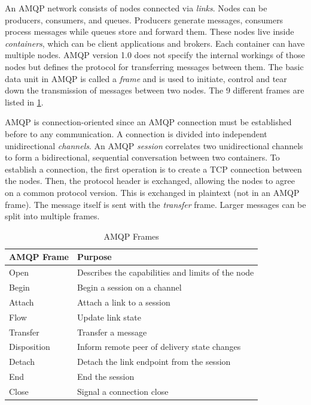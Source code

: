An AMQP network consists of nodes connected via \textit{links}. Nodes can be
producers, consumers, and queues. Producers generate messages, consumers process
messages while queues store and forward them. These nodes live inside
\textit{containers}, which can be client applications and brokers. Each
container can have multiple nodes. AMQP version 1.0 does not specify the
internal workings of those nodes but defines the protocol for transferring
messages between them. The basic data unit in AMQP is called a \textit{frame}
and is used to initiate, control and tear down the transmission of messages
between two nodes. The 9 different frames are listed in
\cref{table-amqp-frames}.

AMQP is connection-oriented since an AMQP connection must be established before
to any communication. A connection is divided into independent unidirectional
\textit{channels}. An AMQP \textit{session} correlates two unidirectional
channels to form a bidirectional, sequential conversation between two
containers. To establish a connection, the first operation is to create a TCP
connection between the nodes. Then, the protocol header is exchanged, allowing
the nodes to agree on a common protocol version. This is exchanged in plaintext
(not in an AMQP frame). The message itself is sent with the \textit{transfer}
frame. Larger messages can be split into multiple frames.


\begin{table}[h]
\begin{tabularx}{\textwidth}{| X | X |}
\hline
  \textbf{AMQP Frame} & \textbf{Purpose} \\ \hline
  Open & Describes the capabilities and limits of the node \\ \hline
  Begin & Begin a session on a channel \\ \hline
  Attach & Attach a link to a session \\ \hline
  Flow & Update link state \\ \hline
  Transfer & Transfer a message \\ \hline
  Disposition & Inform remote peer of delivery state changes \\ \hline
  Detach & Detach the link endpoint from the session \\ \hline
  End & End the session\\ \hline
  Close & Signal a connection close\\ \hline
\end{tabularx}
\caption{AMQP Frames}
\label{table-amqp-frames}
\end{table}

